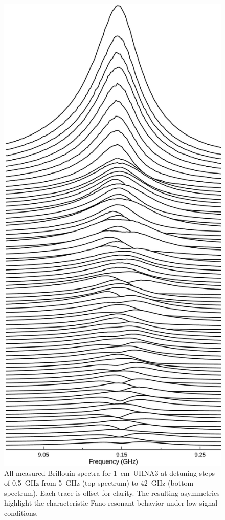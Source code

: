 \begin{figure}[ht]
\centering
\includegraphics[height=0.90\textheight]{figs/3-CoBS/JoyDivisionCoBSUHNA3.pdf}
\caption{All measured Brillouin spectra for \SI{1}{\centi\meter}~UHNA3 at detuning steps of \SI{0.5}{\giga\hertz} from \SI{5}{\giga\hertz} (top spectrum) to \SI{42}{\giga\hertz} (bottom spectrum). Each trace is offset for clarity. The resulting asymmetries highlight the characteristic Fano-resonant behavior under low signal conditions.}
\label{fig:Joy Division UHNA3}
\end{figure}

